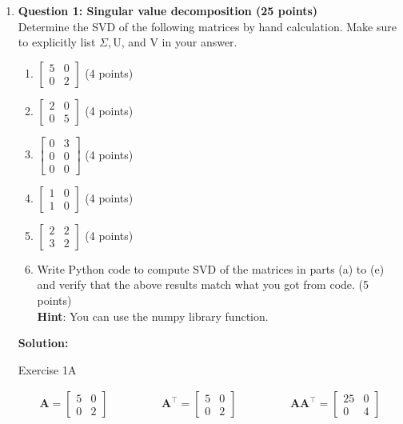 \documentclass[11pt,letterpaper]{article}
\begin{document}
\clearpage
\begin{enumerate}

\item[] \textbf{Question 1: Singular value decomposition (25 points)}
\\
Determine the SVD of the following matrices by hand calculation. Make sure to explicitly list $\Sigma, \textrm{U}$, and \textrm{V} in your answer.
\begin{enumerate}[label=(\alph*)]
    \item $\begin{bmatrix}
    5 & 0 \\ 0 & 2
    \end{bmatrix}$  (4 points)
    \item $\begin{bmatrix}
    2 & 0 \\ 0 & 5
    \end{bmatrix}$  (4 points)
    \item $\begin{bmatrix}
    0 & 3 \\ 0 & 0 \\ 0 & 0
    \end{bmatrix}$  (4 points)
    \item $\begin{bmatrix}
    1 & 0 \\ 1 & 0
    \end{bmatrix}$  (4 points)
    \item $\begin{bmatrix}
    2 & 2 \\ 3 & 2
    \end{bmatrix}$  (4 points)
    \item Write Python code to compute SVD of the matrices in parts (a) to (e) and verify that the above results match what you got from code.  (5 points)\\
    \textbf{Hint}: You can use the numpy library function.\\
\end{enumerate}

\textbf{Solution:}

\noindent\dotfill Exercise 1A \noindent\dotfill

\begin{align*}
    \mathbf{A} 
    = \begin{bmatrix}
        5 & 0 \\
        0 & 2
    \end{bmatrix}
    \hspace{2cm}
    \mathbf{A^\top} 
    = \begin{bmatrix}
        5 & 0 \\
        0 & 2
    \end{bmatrix}
    \hspace{2cm}
    \mathbf{A A^\top} 
    = \begin{bmatrix}
        25 & 0 \\
        0 & 4
    \end{bmatrix}
\end{align*}


\end{enumerate}
\end{document}
